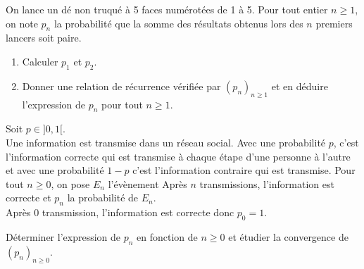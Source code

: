 \documentclass[a4paper,10pt]{report}
\begin{document}
\begin{Exercice}{} On lance un dé non truqué à 5 faces numérotées de 1 à 5. Pour tout entier $n \geq 1$, on note $p_n$ la probabilité que la somme des résultats obtenus lors des $n$ premiers lancers soit paire. 
\begin{enumerate}
\item Calculer $p_1$ et $p_2$.
\item Donner une relation de récurrence vérifiée par $(p_n)_{n \geq 1}$ et en déduire l'expression de $p_n$ pour tout $n \geq 1$.
\end{enumerate}
\end{Exercice}


\begin{Exercice}{} Soit $p \in ]0,1[$. \\
Une information est transmise dans un réseau social. Avec une probabilité $p$, c'est l'information correcte qui est transmise à chaque étape d'une personne à l'autre et avec une probabilité $1-p$ c'est l'information contraire qui est transmise. Pour tout $n \geq 0$, on pose $E_n$ l'évènement \og Après $n$ transmissions, l'information est correcte \fg et $p_n$ la probabilité de $E_n$. \\
\noindent Après 0 transmission, l'information est correcte donc $p_0=1$.

\medskip Déterminer l'expression de $p_n$ en fonction de $n \geq 0$ et étudier la convergence de $(p_n)_{n \geq 0}$.
\end{Exercice}
\end{document}
